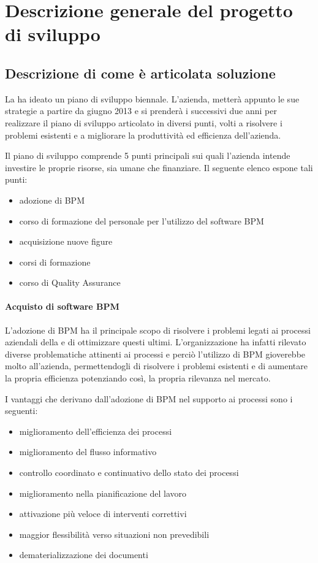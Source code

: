 \chapter{Descrizione generale del progetto di sviluppo}

\section{Descrizione di come è articolata soluzione}
La \customer ha ideato un piano di sviluppo biennale. L'azienda, metterà appunto le sue strategie a partire da giugno 2013 e si prenderà i successivi due anni per realizzare il piano di sviluppo articolato in diversi punti, volti a risolvere i problemi esistenti e a migliorare la produttività ed efficienza dell'azienda.
		
Il piano di sviluppo comprende 5 punti principali sui quali l'azienda intende investire le proprie risorse, sia umane che finanziare. Il seguente elenco espone tali punti:
	\begin{itemize}
  		\item adozione di  BPM
       \item corso di formazione del personale per l'utilizzo del software BPM
       \item acquisizione nuove figure
       \item corsi di formazione 
        \item corso di Quality Assurance  
     \end{itemize}
	
	
    \subsubsection{Acquisto di software BPM}
    
    L'adozione di  BPM ha il principale scopo di risolvere i problemi legati ai processi aziendali della \customer e di ottimizzare questi ultimi. L'organizzazione ha infatti rilevato diverse problematiche attinenti ai processi e perciò l'utilizzo di \sw BPM gioverebbe molto all'azienda, permettendogli di risolvere i problemi esistenti e di aumentare la propria efficienza potenziando così, la propria rilevanza nel mercato.



I vantaggi che derivano dall'adozione di \sw BPM nel supporto ai processi sono i seguenti:

\begin{itemize}
	\item miglioramento dell'efficienza dei processi
	\item miglioramento del flusso informativo
	\item controllo coordinato e continuativo dello stato dei processi
	\item miglioramento nella pianificazione del lavoro
	\item attivazione più veloce di interventi correttivi
	\item maggior flessibilità verso situazioni non prevedibili
	\item dematerializzazione dei documenti 	
\end{itemize}


